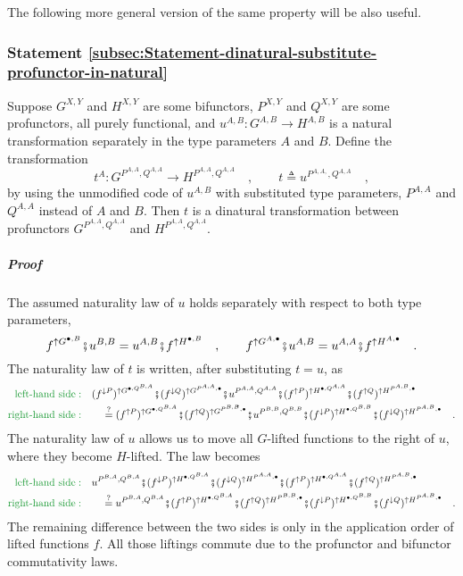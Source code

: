 The following more general version of the same property will be also
useful.

\subsubsection{Statement \label{subsec:Statement-dinatural-substitute-profunctor-in-natural}\ref{subsec:Statement-dinatural-substitute-profunctor-in-natural}}

Suppose $G^{X,Y}$ and $H^{X,Y}$ are some bifunctors, $P^{X,Y}$
and $Q^{X,Y}$ are some profunctors, all purely functional, and $u^{A,B}:G^{A,B}\rightarrow H^{A,B}$
is a natural transformation separately in the type parameters $A$
and $B$. Define the transformation 
\[
t^{A}:G^{P^{A,A},Q^{A,A}}\rightarrow H^{P^{A,A},Q^{A,A}}\quad,\quad\quad t\triangleq u^{P^{A,A,},Q^{A,A}}\quad,
\]
by using the unmodified code of $u^{A,B}$ with substituted type parameters,
$P^{A,A}$ and $Q^{A,A}$ instead of $A$ and $B$. Then $t$ is a
dinatural transformation between profunctors $G^{P^{A,A},Q^{A,A}}$
and $H^{P^{A,A},Q^{A,A}}$.

\subparagraph{Proof}

The assumed naturality law of $u$ holds separately with respect to
both type parameters,
\[
f^{\uparrow G^{\bullet,B}}\bef u^{B,B}=u^{A,B}\bef f^{\uparrow H^{\bullet,B}}\quad,\quad\quad f^{\uparrow G^{A,\bullet}}\bef u^{A,B}=u^{A,A}\bef f^{\uparrow H^{A,\bullet}}\quad.
\]
 The naturality law of $t$ is written, after substituting $t=u$,
as
\begin{align*}
{\color{greenunder}\text{left-hand side}:}\quad & (f^{\downarrow P})^{\uparrow G^{\bullet,Q^{B,A}}}\bef(f^{\downarrow Q})^{\uparrow G^{P^{A,A},\bullet}}\bef u^{P^{A,A},Q^{A,A}}\bef(f^{\uparrow P})^{\uparrow H^{\bullet,Q^{A,A}}}\bef(f^{\uparrow Q})^{\uparrow H^{P^{A,B},\bullet}}\\
{\color{greenunder}\text{right-hand side}:}\quad & \quad\overset{?}{=}(f^{\uparrow P})^{\uparrow G^{\bullet,Q^{B,A}}}\bef(f^{\uparrow Q})^{\uparrow G^{P^{B,B},\bullet}}\bef u^{P^{B,B},Q^{B,B}}\bef(f^{\downarrow P})^{\uparrow H^{\bullet,Q^{B,B}}}\bef(f^{\downarrow Q})^{\uparrow H^{P^{A,B},\bullet}}\quad.
\end{align*}
The naturality law of $u$ allows us to move all $G$-lifted functions
to the right of $u$, where they become $H$-lifted. The law becomes
\begin{align*}
{\color{greenunder}\text{left-hand side}:}\quad & u^{P^{B,A},Q^{B,A}}\bef(f^{\downarrow P})^{\uparrow H^{\bullet,Q^{B,A}}}\bef(f^{\downarrow Q})^{\uparrow H^{P^{A,A},\bullet}}\bef(f^{\uparrow P})^{\uparrow H^{\bullet,Q^{A,A}}}\bef(f^{\uparrow Q})^{\uparrow H^{P^{A,B},\bullet}}\\
{\color{greenunder}\text{right-hand side}:}\quad & \quad\overset{?}{=}u^{P^{B,A},Q^{B,A}}\bef(f^{\uparrow P})^{\uparrow H^{\bullet,Q^{B,A}}}\bef(f^{\uparrow Q})^{\uparrow H^{P^{B,B},\bullet}}\bef(f^{\downarrow P})^{\uparrow H^{\bullet,Q^{B,B}}}\bef(f^{\downarrow Q})^{\uparrow H^{P^{A,B},\bullet}}\quad.
\end{align*}
The remaining difference between the two sides is only in the application
order of lifted functions $f$. All those liftings commute due to
the profunctor and bifunctor commutativity laws.

